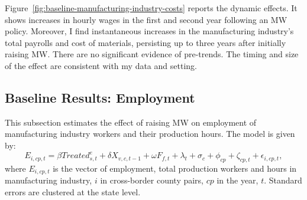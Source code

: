 \documentclass[12pt, english]{article}
\begin{document}
    Figure~\ref{fig:baseline-manufacturing-industry-costs} reports the dynamic effects. It shows increases in hourly wages in the first and second year following an MW policy. Moreover, I find instantaneous increases in the manufacturing industry's total payrolls and cost of materials, persisting up to three years after initially raising MW. There are no significant evidence of pre-trends. The timing and size of the effect are consistent with my data and setting.

    \subsection{Baseline Results: Employment}\label{subsec:baseline-results-employment}
    This subsection estimates the effect of raising MW on employment of manufacturing industry workers and their production hours. The model is given by:
    \begin{equation}
        E_{i,cp,t} = \beta Treated_{s,t}^e + \delta X_{v,c,t-1} + \omega F_{f,t} + \lambda_{t} + \sigma_{c} + \phi_{cp} + \zeta_{cp,t} + \epsilon_{i,cp,t},\label{eq:baseline-emp-hours}
    \end{equation}
    where $E_{i,cp,t}$ is the vector of employment, total production workers and hours in manufacturing industry, $i$ in cross-border county pairs, $cp$ in the year, $t$. Standard errors are clustered at the state level.
    
\end{document}
